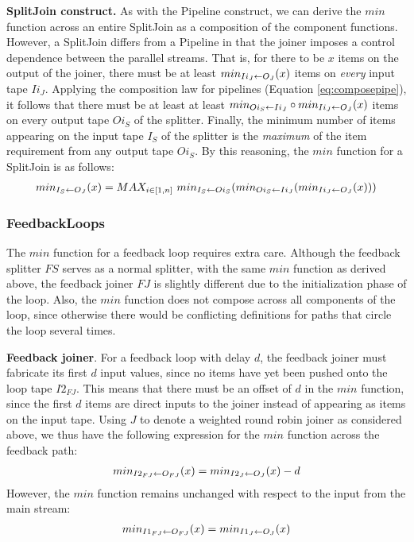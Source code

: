 {\bf SplitJoin construct.}  As with the Pipeline construct, we can
derive the $min$ function across an entire SplitJoin as a composition
of the component functions.  However, a SplitJoin differs from a
Pipeline in that the joiner imposes a control dependence between the
parallel streams.  That is, for there to be $x$ items on the output of
the joiner, there must be at least $min_{Ii_J \leftarrow O_J}(x)$ items on {\it
every} input tape $Ii_J$.  Applying the composition law for pipelines
(Equation \ref{eq:composepipe}), it follows that there must be at
least at least $min_{Oi_S \leftarrow Ii_J} \circ min_{Ii_J \leftarrow O_J}(x)$ items on
every output tape $Oi_S$ of the splitter.  Finally, the minimum number
of items appearing on the input tape $I_S$ of the splitter is the {\it
maximum} of the item requirement from any output tape $Oi_S$.  By this
reasoning, the $min$ function for a SplitJoin is as follows:
\begin{align*}
min_{I_S \leftarrow O_J}(x) = MAX_{i \in [1,n]}~min_{I_S \leftarrow Oi_S}(min_{Oi_S \leftarrow Ii_J}(min_{Ii_J \leftarrow O_J}(x)))
\end{align*}

\subsubsection{FeedbackLoops}
\label{sec:timefl}

The $min$ function for a feedback loop requires extra care. Although
the feedback splitter $FS$ serves as a normal splitter, with the same
$min$ function as derived above, the feedback joiner $FJ$ is slightly
different due to the initialization phase of the loop.  Also, the
$min$ function does not compose across all components of the loop,
since otherwise there would be conflicting definitions for paths that
circle the loop several times.

{\bf Feedback joiner}.  For a feedback loop with delay $d$, the
feedback joiner must fabricate its first $d$ input values, since no
items have yet been pushed onto the loop tape $I2_{FJ}$.  This means
that there must be an offset of $d$ in the $min$ function, since the
first $d$ items are direct inputs to the joiner instead of appearing
as items on the input tape.  Using $J$ to denote a weighted round
robin joiner as considered above, we thus have the following
expression for the $min$ function across the feedback path:
\begin{align*}
min_{I2_{FJ} \leftarrow O_{FJ}}(x) = min_{I2_J \leftarrow O_J}(x) - d
\end{align*}
However, the $min$ function remains unchanged with respect to the
input from the main stream:
\begin{align*}
min_{I1_{FJ} \leftarrow O_{FJ}}(x) = min_{I1_J \leftarrow O_J}(x)
\end{align*}

